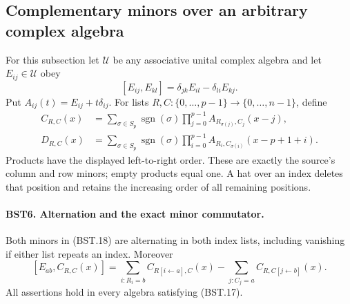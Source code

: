 \subsection{Complementary minors over an arbitrary complex algebra}

For this subsection let $\mathcal U$ be any associative unital complex
algebra and let $E_{ij}\in\mathcal U$ obey
\[
 [E_{ij},E_{kl}]=\delta_{jk}E_{il}-\delta_{li}E_{kj}.
 \tag{BST.17}
\]
Put $A_{ij}(t)=E_{ij}+t\delta_{ij}$.  For lists
$R,C:\{0,\ldots,p-1\}\to\{0,\ldots,n-1\}$, define
\[
 \begin{split}
 C_{R,C}(x)
  &=\sum_{\sigma\in S_p}\operatorname{sgn}(\sigma)
       \prod_{j=0}^{p-1}A_{R_{\sigma(j)},C_j}(x-j),\\
 D_{R,C}(x)
  &=\sum_{\sigma\in S_p}\operatorname{sgn}(\sigma)
       \prod_{i=0}^{p-1}A_{R_i,C_{\sigma(i)}}(x-p+1+i).
 \end{split}
 \tag{BST.18}
\]
Products have the displayed left-to-right order.  These are exactly
the source's column and row minors; empty products equal one.
A hat over an index deletes that position and retains the increasing
order of all remaining positions.

\paragraph{BST6. Alternation and the exact minor commutator.}
\label{claim:BST6}
Both minors in (BST.18) are alternating in both index lists, including
vanishing if either list repeats an index.  Moreover
\[
 [E_{ab},C_{R,C}(x)]
 =\sum_{i:R_i=b}C_{R[i\leftarrow a],C}(x)
  -\sum_{j:C_j=a}C_{R,C[j\leftarrow b]}(x).
 \tag{BST.19}
\]
All assertions hold in every algebra satisfying (BST.17).

